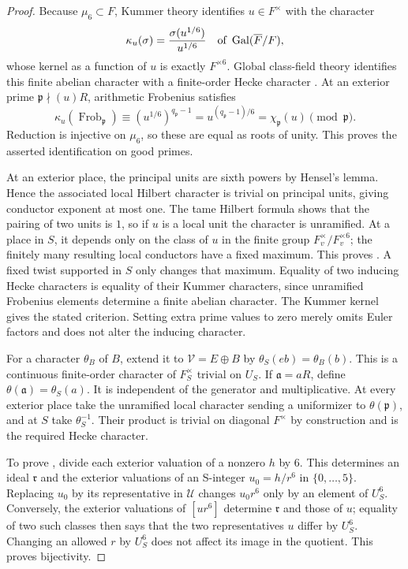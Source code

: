 \begin{proof}
Because \(\mu_6\subset F\), Kummer theory
\cite[Chapter~IV, Theorem~(3.3) and Corollary~(3.6)]{Neukirch99}
identifies \(u\in F^\times\) with
the character
\[
 \kappa_u(\sigma)=\frac{\sigma(u^{1/6})}{u^{1/6}}
 \quad\text{of }\operatorname{Gal}(\overline F/F),
\]
whose kernel as a function of \(u\) is exactly \(F^{\times6}\).
Global class-field theory identifies this finite abelian character with a
finite-order Hecke character
\cite[Chapter~VI, Theorem~(5.5) and Proposition~(5.6)]{Neukirch99}.
At an exterior prime
\(\mathfrak p\nmid(u)R\), arithmetic Frobenius satisfies
\[
 \kappa_u(\operatorname{Frob}_{\mathfrak p})
 \equiv (u^{1/6})^{q_{\mathfrak p}-1}
 =u^{(q_{\mathfrak p}-1)/6}
 =\chi_{\mathfrak p}(u)\pmod{\mathfrak p}.
\]
Reduction is injective on \(\mu_6\), so these are equal as roots of unity.
This proves the asserted identification on good primes.

At an exterior place, the principal units are sixth powers by Hensel's
lemma.  Hence the associated local Hilbert character is trivial on principal
units, giving conductor exponent at most one.  The tame Hilbert formula
\cite[Chapter~V, Proposition~(3.4)]{Neukirch99} shows that the pairing of
two units is \(1\), so if \(u\) is a local unit the character is unramified.
At a place in \(S\), it depends only on the class of \(u\) in
the finite group \(F_v^\times/F_v^{\times6}\); the finitely many resulting
local conductors have a fixed maximum.  This proves
.  A fixed twist supported in \(S\) only changes
that maximum.  Equality of two inducing Hecke characters is equality of
their Kummer characters, since unramified Frobenius elements determine a
finite abelian character.  The Kummer kernel gives the stated criterion.
Setting extra prime values to zero merely omits Euler factors and does not
alter the inducing character.

For a character \(\theta_B\) of \(B\), extend it to \(\mathcal V=E\oplus B\)
by \(\theta_S(eb)=\theta_B(b)\).  This is a continuous finite-order character
of \(F_S^\times\) trivial on \(U_S\).  If \(\mathfrak a=aR\), define
\(\theta(\mathfrak a)=\theta_S(a)\).  It is independent of the generator
and multiplicative.  At every exterior place take the unramified local
character sending a uniformizer to \(\theta(\mathfrak p)\), and at \(S\)
take \(\theta_S^{-1}\).  Their product is trivial on diagonal \(F^\times\)
by construction and is the required Hecke character.

To prove , divide each exterior valuation
of a nonzero \(h\) by \(6\).  This determines an ideal \(\mathfrak r\) and
the exterior valuations of an S-integer \(u_0=h/r^6\) in
\(\{0,\ldots,5\}\).  Replacing \(u_0\) by its representative in
\(\mathcal U\) changes \(u_0r^6\) only by an element of \(U_S^6\).
Conversely, the exterior valuations of \([ur^6]\) determine
\(\mathfrak r\) and those of \(u\); equality of two such classes then says
that the two representatives \(u\) differ by \(U_S^6\).  Changing an
allowed \(r\) by \(U_S^6\) does not affect its image in the quotient.
This proves bijectivity.


\end{proof}
